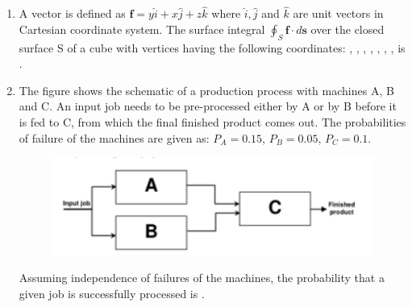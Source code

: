 \documentclass[journal,12pt,onecolumn]{IEEEtran}
\theoremstyle{remark}
\begin{document}
\begin{enumerate}
    \hfill{}
        \begin{enumerate}
        \end{enumerate}

    \item A vector is defined as $\mathbf{f} = y\hat{i} + x\hat{j} + z\hat{k}$ where $\hat{i}, \hat{j}$ and $\hat{k}$ are unit vectors in Cartesian  coordinate system. The surface integral $\oint_S \mathbf{f} \cdot d\mathbf{s}$ over the closed surface S of a cube with vertices having the following coordinates: , , , , , , ,  is \underline{\hspace{2cm}}.

    \hfill{}

    

    \item The figure shows the schematic of a production process with machines A, B and C. An input job needs to be pre-processed either by A or by B before it is fed to C, from which the final finished product comes out. The probabilities of failure of the machines are given as: $P_A = 0.15$, $P_B = 0.05$, $P_C = 0.1$.
    \begin{figure}[H]
        \centering
        \includegraphics[width=0.4\columnwidth]{q5}
        \caption*{}
        \label{fig:q5}
    \end{figure}
    Assuming independence of failures of the machines, the probability that a given job is successfully processed  is \underline{\hspace{2cm}}.

    \hfill{}

    


\end{enumerate}
\end{document}
